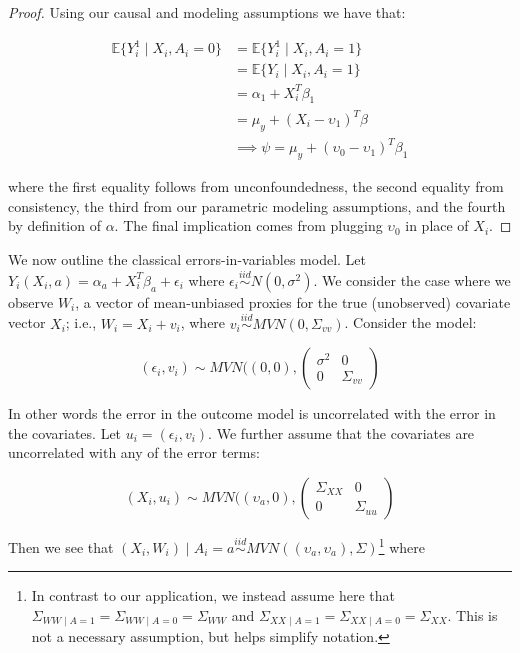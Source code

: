 \begin{proof}

Using our causal and modeling assumptions we have that:

\begin{align*}
\mathbb{E}\{Y_i^1 \mid X_i, A_i = 0\} &= \mathbb{E}\{Y_i^1 \mid X_i, A_i = 1\} \\
&= \mathbb{E}\{Y_i \mid X_i, A_i = 1\} \\
&= \alpha_1 + X_i^T\beta_1 \\
&= \mu_y + (X_i - \upsilon_1)^T\beta \\
&\implies \psi = \mu_y + (\upsilon_0 - \upsilon_1)^T\beta_1
\end{align*}

where the first equality follows from unconfoundedness, the second equality from consistency, the third from our parametric modeling assumptions, and the fourth by definition of $\alpha$. The final implication comes from plugging $\upsilon_0$ in place of $X_i$.

\end{proof}

We now outline the classical errors-in-variables model. Let $Y_i(X_i, a) = \alpha_a + X_i^T\beta_a + \epsilon_i$ where $\epsilon_i \stackrel{iid}\sim N(0, \sigma^2)$. We consider the case where we observe $W_i$, a vector of mean-unbiased proxies for the true (unobserved) covariate vector $X_i$; i.e., $W_i = X_i + v_i$, where $v_i \stackrel{iid}\sim MVN(0, \Sigma_{vv})$. Consider the model:

\begin{equation}
(\epsilon_i, v_i) \sim MVN((0, 0), \begin{pmatrix} 
\sigma^2 & 0 \\ 
0 & \Sigma_{vv}  
\end{pmatrix}
\end{equation}

In other words the error in the outcome model is uncorrelated with the error in the covariates. Let $u_i = (\epsilon_i, v_i)$. We further assume that the covariates are uncorrelated with any of the error terms:

\begin{equation}
(X_i, u_i) \sim MVN((\upsilon_a, 0), \begin{pmatrix} 
\Sigma_{XX} & 0 \\ 
0 & \Sigma_{uu}  
\end{pmatrix}
\end{equation}

Then we see that $(X_i, W_i) \mid A_i = a \stackrel{iid}{\sim} MVN((\upsilon_a, \upsilon_a), \Sigma)$\footnote{In contrast to our application, we instead assume here that $\Sigma_{WW \mid A = 1} = \Sigma_{WW \mid A = 0} = \Sigma_{WW}$ and $\Sigma_{XX \mid A = 1} = \Sigma_{XX \mid A = 0} = \Sigma_{XX}$. This is not a necessary assumption, but helps simplify notation.} where 

